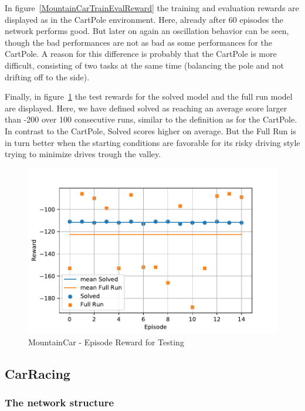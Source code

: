 \documentclass[
        a4paper,
        10pt,
        parskip = full,    %
    ]{scrartcl}
\begin{document}
In figure~\ref{MountainCarTrainEvalReward} the training and evaluation rewards
are displayed as in the CartPole environment. Here, already after 60
episodes the network performs good. But later on again an oscillation behavior
can be seen, though the bad performances are not as bad
as some performances for the CartPole. A reason for this difference is probably
that the CartPole is more difficult, consisting of two tasks at the same time
(balancing the pole and not drifting off to the side).

Finally, in figure~\ref{MountainCarTestReward} the test rewards for the
solved model and the full run model are displayed. Here, we have defined solved
as reaching an average score larger than -200 over 100 consecutive runs,
similar to the definition as for the CartPole. In contrast to the CartPole,
Solved scores higher on average. But the Full Run is in turn better when
the starting conditions are favorable for its risky driving style trying to
minimize drives trough the valley.

\begin{figure}[H]
  \begin{center}
    \includegraphics{./images/MountainCar-v0/tb_test_reward.pdf}
    \caption{MountainCar - Episode Reward for Testing}
    \label{MountainCarTestReward}
  \end{center}
\end{figure}


\subsection{CarRacing}

\subsubsection{The network structure}
\end{document}
